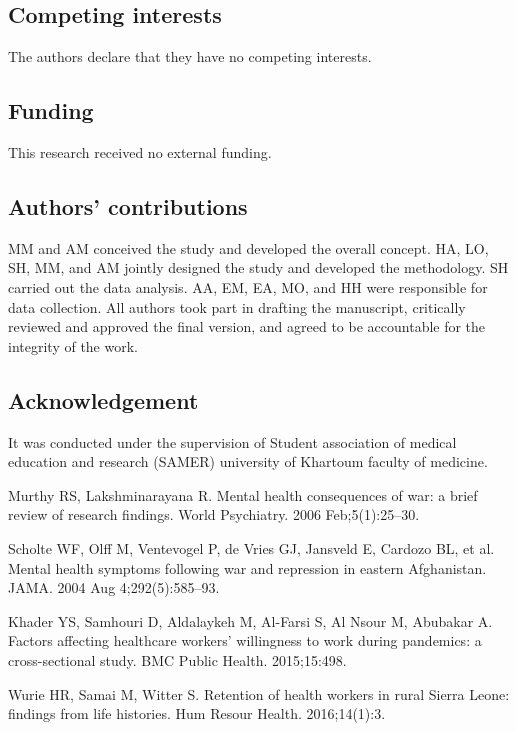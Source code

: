 \documentclass[12pt]{article}
\begin{document}
\subsection*{Competing interests}
The authors declare that they have no competing interests.

\subsection*{Funding}
This research received no external funding.

\subsection*{Authors' contributions}
MM and AM conceived the study and developed the overall concept. HA, LO, SH, MM, and AM jointly designed the study and developed the methodology. SH carried out the data analysis. AA, EM, EA, MO, and HH were responsible for data collection. All authors took part in drafting the manuscript, critically reviewed and approved the final version, and agreed to be accountable for the integrity of the work.

\subsection*{Acknowledgement}
It was conducted under the supervision of Student association of medical education and research (SAMER) university of Khartoum faculty of medicine.

\printbibliography

\begin{thebibliography}{99}
Murthy RS, Lakshminarayana R. Mental health consequences of war: a brief review of research findings. World Psychiatry. 2006 Feb;5(1):25–30.

Scholte WF, Olff M, Ventevogel P, de Vries GJ, Jansveld E, Cardozo BL, et al. Mental health symptoms following war and repression in eastern Afghanistan. JAMA. 2004 Aug 4;292(5):585–93.

Khader YS, Samhouri D, Aldalaykeh M, Al-Farsi S, Al Nsour M, Abubakar A. Factors affecting healthcare workers’ willingness to work during pandemics: a cross-sectional study. BMC Public Health. 2015;15:498.

Wurie HR, Samai M, Witter S. Retention of health workers in rural Sierra Leone: findings from life histories. Hum Resour Health. 2016;14(1):3.


\end{thebibliography}
\end{document}
